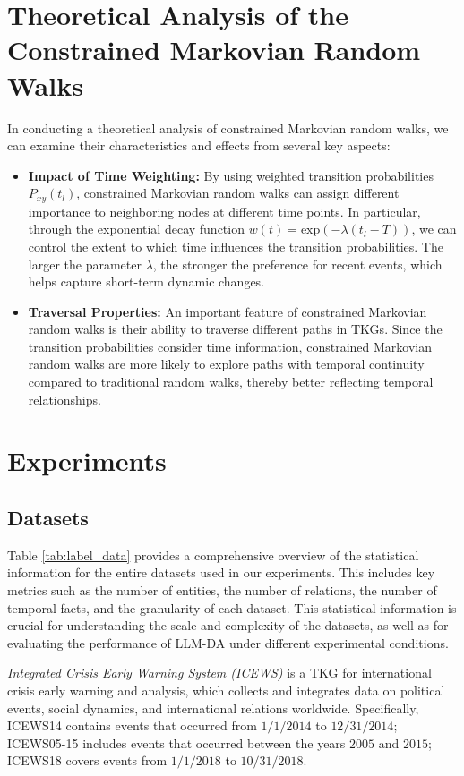 \documentclass{article}
\begin{document}
\clearpage

\section{Theoretical Analysis of the Constrained Markovian Random Walks}\label{TA}
In conducting a theoretical analysis of constrained Markovian random walks, we can examine their characteristics and effects from several key aspects:
\begin{itemize}
    \item \textbf{Impact of Time Weighting:} By using weighted transition probabilities $P_{xy}(t_l)$, constrained Markovian random walks can assign different importance to neighboring nodes at different time points. In particular, through the exponential decay function $w(t)=\text{exp}({-\lambda(t_l-T)})$, we can control the extent to which time influences the transition probabilities. The larger the parameter $\lambda$, the stronger the preference for recent events, which helps capture short-term dynamic changes.
    \item \textbf{Traversal Properties:} An important feature of constrained Markovian random walks is their ability to traverse different paths in TKGs. Since the transition probabilities consider time information, constrained Markovian random walks are more likely to explore paths with temporal continuity compared to traditional random walks, thereby better reflecting temporal relationships.
\end{itemize}

\section{Experiments}

\subsection{Datasets}\label{dataset}
Table \ref{tab:label_data} provides a comprehensive overview of the statistical information for the entire datasets used in our experiments. This includes key metrics such as the number of entities, the number of relations, the number of temporal facts, and the granularity of each dataset. This statistical information is crucial for understanding the scale and complexity of the datasets, as well as for evaluating the performance of LLM-DA under different experimental conditions.

\textit{Integrated Crisis Early Warning System (ICEWS)} is a TKG for international crisis early warning and analysis, which collects and integrates data on political events, social dynamics, and international relations worldwide. Specifically, ICEWS14 \cite{Learning2018} contains events that occurred from $1/1/2014$ to $12/31/2014$; ICEWS05-15 \cite{Learning2018} includes events that occurred between the years $2005$ and $2015$; ICEWS18 \cite{xia2024enhancing} covers events from $1/1/2018$ to $10/31/2018$.
\end{document}
